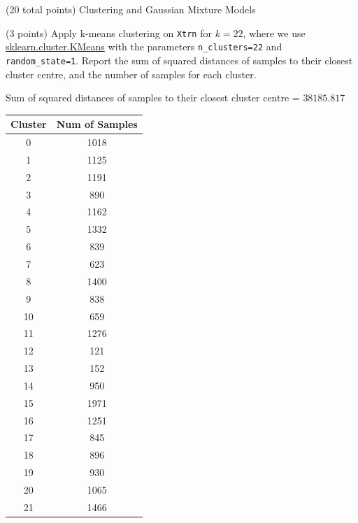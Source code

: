 \documentclass[12pt]{article}
\begin{document}
\begin{question}{(20 total points) Clustering and Gaussian Mixture Models}  


  


  \medskip
   \begin{subquestion}{(3 points)
       Apply k-means clustering on {\tt Xtrn} for $k = 22$, where we use
       \href{https://scikit-learn.org/0.19/modules/generated/sklearn.cluster.KMeans.html}{sklearn.cluster.KMeans}
       with the parameters {\tt n\_clusters=22} and {\tt random\_state=1}.
       Report the sum of squared distances of samples to their closest
       cluster centre, and the number of samples for each cluster.
     } \label{Q3.1}
   

      \begin{answerbox}{35em}
        Sum of squared distances of samples to their closest cluster centre = $38185.817$
         \begin{center}
            \begin{tabular}{|c|c|}
                \hline
                Cluster & Num of Samples \\ \hline
                0 & 1018 \\
                1 & 1125 \\
                2 & 1191 \\
                3 & 890 \\
                4 & 1162 \\
                5 & 1332 \\
                6 & 839 \\
                7 & 623 \\
                8 & 1400 \\
                9 & 838 \\
                10 & 659 \\
                11 & 1276 \\
                12 & 121 \\
                13 & 152 \\
                14 & 950 \\
                15 & 1971 \\
                16 & 1251 \\
                17 & 845 \\
                18 & 896 \\
                19 & 930 \\
                20 & 1065 \\
                21 & 1466 \\
                \hline
            \end{tabular}    
         \end{center}
         

\end{answerbox}
\end{subquestion}
\end{question}
\end{document}
